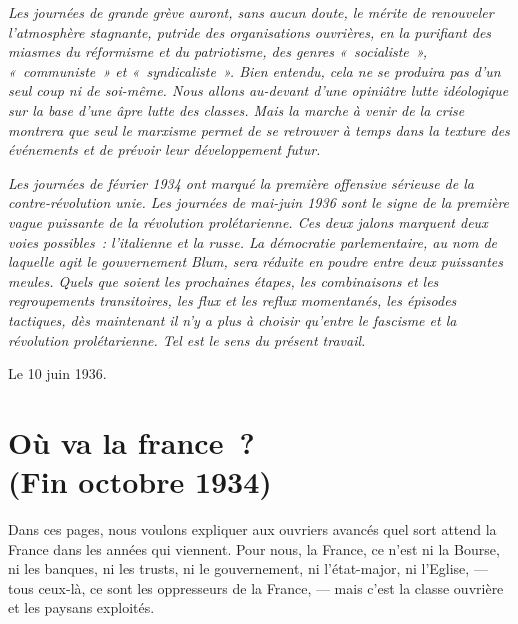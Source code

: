 \documentclass[french,twoside]{book} %
\newcommand{\byline}[1]{\bigskip{\RaggedLeft{#1}\par}\bigskip}
\newcommand\chapteropen{} %
\newcommand\chaptercont{} %
\newcommand\chapterclose{} %
\begin{document}
 \emph{Les journées de grande grève auront, sans aucun doute, le mérite de renouveler l’atmosphère stagnante, putride des organisations ouvrières, en la purifiant des miasmes du réformisme et du  patriotisme, des genres « socialiste », « communiste » et « syndicaliste ». Bien entendu, cela ne se produira pas d’un seul coup ni de soi-même. Nous allons au-devant d’une opiniâtre lutte idéologique sur la base d’une âpre lutte des classes. Mais la marche à venir de la crise montrera que seul le marxisme permet de se retrouver à temps dans la texture des événements et de prévoir leur développement futur.} \par
 \emph{Les journées de février 1934 ont marqué la première offensive sérieuse de la contre-révolution unie. Les journées de mai-juin 1936 sont le signe de la première vague puissante de la révolution prolétarienne. Ces deux jalons marquent deux voies possibles : l’italienne et la russe. La démocratie parlementaire, au nom de laquelle agit le gouvernement Blum, sera réduite en poudre entre deux puissantes meules. Quels que soient les prochaines étapes, les combinaisons et les regroupements transitoires, les flux et les reflux momentanés, les épisodes tactiques, dès maintenant il n’y a plus à choisir qu’entre le fascisme et la révolution prolétarienne. Tel est le sens du présent travail.} \par
Le 10 juin 1936.\par

\byline{L. T{\scshape rotsky}.}
 \chapterclose


\chapteropen
 \chapter[{Où va la france ? (Fin octobre 1934)}]{Où va la france ? \\
(Fin octobre 1934)}
\label{p2}\renewcommand{\leftmark}{Où va la france ? \\
(Fin octobre 1934)}


\chaptercont
\noindent Dans ces pages, nous voulons expliquer aux ouvriers avancés quel sort attend la France dans les années qui viennent. Pour nous, la France, ce n’est ni la Bourse, ni les banques, ni les trusts, ni le gouvernement, ni l’état-major, ni l’Eglise, — tous ceux-là, ce sont les oppresseurs de la France, — mais c’est la classe ouvrière et les paysans exploités.\par
\end{document}
